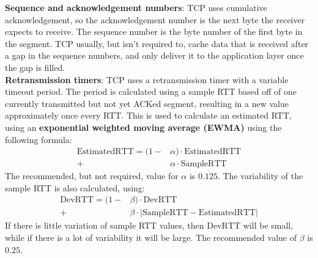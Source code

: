 \textbf{Sequence and acknowledgement numbers}: TCP uses cumulative acknowledgement, so the acknowledgement number is the next byte the receiver expects to receive. The sequence number is the byte number of the first byte in the segment. TCP usually, but isn't required to, cache data that is received after a gap in the sequence numbers, and only deliver it to the application layer once the gap is filled.\\
\textbf{Retransmission timers}: TCP uses a retransmission timer with a variable timeout period. The period is calculated using a sample RTT based off of one currently transmitted but not yet ACKed segment, resulting in a new value approximately once every RTT. This is used to calculate an estimated RTT, using an \textbf{exponential weighted moving average (EWMA)} using the following formula:
\[
	\begin{aligned}
		\text{EstimatedRTT}  =  (1- & \alpha)\cdot\text{EstimatedRTT} \\
		+                           & \alpha\cdot\text{SampleRTT}
	\end{aligned}
\]
The recommended, but not required, value for $\alpha$ is $0.125$.
The variability of the sample RTT is also calculated, using:
\[
	\begin{aligned}
		\text{DevRTT}=(1- & \beta)\cdot\text{DevRTT}                                            \\
		+                 & \beta\cdot\left\vert\text{SampleRTT}-\text{EstimatedRTT}\right\vert
	\end{aligned}
\]
If there is little variation of sample RTT values, then $\text{DevRTT}$ will be small, while if there is a lot of variability it will be large.
The recommended value of $\beta$ is $0.25$.

